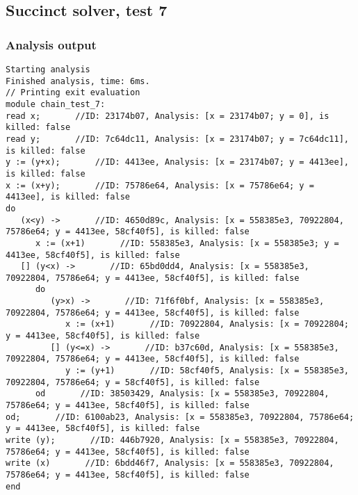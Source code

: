\documentclass{report}
\begin{document}
\subsection{Succinct solver, test 7}
\subsubsection{Analysis output}
\begin{lstlisting}
Starting analysis
Finished analysis, time: 6ms.
// Printing exit evaluation
module chain_test_7:
read x;       //ID: 23174b07, Analysis: [x = 23174b07; y = 0], is killed: false
read y;       //ID: 7c64dc11, Analysis: [x = 23174b07; y = 7c64dc11], is killed: false
y := (y+x);       //ID: 4413ee, Analysis: [x = 23174b07; y = 4413ee], is killed: false
x := (x+y);       //ID: 75786e64, Analysis: [x = 75786e64; y = 4413ee], is killed: false
do
   (x<y) ->       //ID: 4650d89c, Analysis: [x = 558385e3, 70922804, 75786e64; y = 4413ee, 58cf40f5], is killed: false
      x := (x+1)       //ID: 558385e3, Analysis: [x = 558385e3; y = 4413ee, 58cf40f5], is killed: false
   [] (y<x) ->       //ID: 65bd0dd4, Analysis: [x = 558385e3, 70922804, 75786e64; y = 4413ee, 58cf40f5], is killed: false
      do
         (y>x) ->       //ID: 71f6f0bf, Analysis: [x = 558385e3, 70922804, 75786e64; y = 4413ee, 58cf40f5], is killed: false
            x := (x+1)       //ID: 70922804, Analysis: [x = 70922804; y = 4413ee, 58cf40f5], is killed: false
         [] (y<=x) ->       //ID: b37c60d, Analysis: [x = 558385e3, 70922804, 75786e64; y = 4413ee, 58cf40f5], is killed: false
            y := (y+1)       //ID: 58cf40f5, Analysis: [x = 558385e3, 70922804, 75786e64; y = 58cf40f5], is killed: false
      od       //ID: 38503429, Analysis: [x = 558385e3, 70922804, 75786e64; y = 4413ee, 58cf40f5], is killed: false
od;       //ID: 6100ab23, Analysis: [x = 558385e3, 70922804, 75786e64; y = 4413ee, 58cf40f5], is killed: false
write (y);       //ID: 446b7920, Analysis: [x = 558385e3, 70922804, 75786e64; y = 4413ee, 58cf40f5], is killed: false
write (x)       //ID: 6bdd46f7, Analysis: [x = 558385e3, 70922804, 75786e64; y = 4413ee, 58cf40f5], is killed: false
end
\end{lstlisting}
\end{document}

